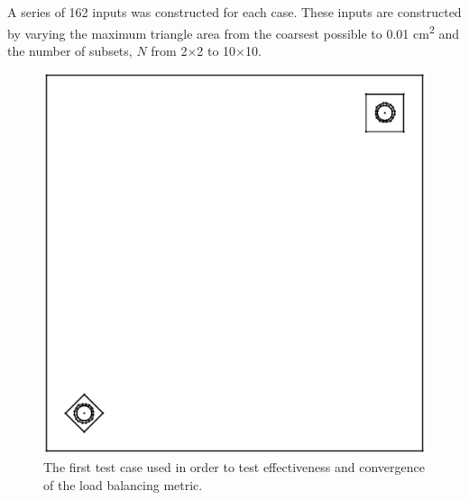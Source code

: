 \documentclass{anstrans}
\begin{document}
A series of 162 inputs was constructed for each case. These inputs are constructed by varying the maximum triangle area from the coarsest possible to 0.01 cm\textsuperscript{2} and the number of subsets, $N$ from 2$\times$2 to 10$\times$10. 

\begin{figure}[H]
\centering
\includegraphics[scale = 0.5]{figures/unbalanced_lattice.eps}
\caption{The first test case used in order to test effectiveness and convergence of the load balancing metric.}
\label{opp}
\end{figure}
\end{document}
